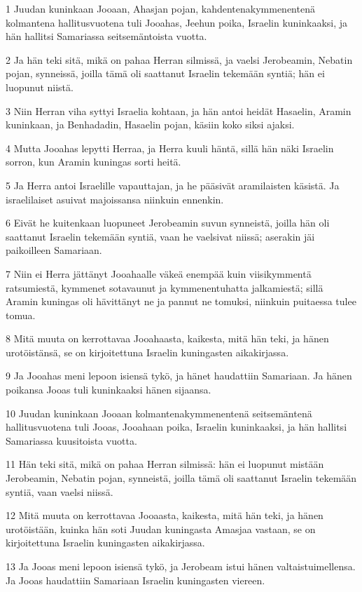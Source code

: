 \par 1 Juudan kuninkaan Jooaan, Ahasjan pojan, kahdentenakymmenentenä kolmantena hallitusvuotena tuli Jooahas, Jeehun poika, Israelin kuninkaaksi, ja hän hallitsi Samariassa seitsemäntoista vuotta.
\par 2 Ja hän teki sitä, mikä on pahaa Herran silmissä, ja vaelsi Jerobeamin, Nebatin pojan, synneissä, joilla tämä oli saattanut Israelin tekemään syntiä; hän ei luopunut niistä.
\par 3 Niin Herran viha syttyi Israelia kohtaan, ja hän antoi heidät Hasaelin, Aramin kuninkaan, ja Benhadadin, Hasaelin pojan, käsiin koko siksi ajaksi.
\par 4 Mutta Jooahas lepytti Herraa, ja Herra kuuli häntä, sillä hän näki Israelin sorron, kun Aramin kuningas sorti heitä.
\par 5 Ja Herra antoi Israelille vapauttajan, ja he pääsivät aramilaisten käsistä. Ja israelilaiset asuivat majoissansa niinkuin ennenkin.
\par 6 Eivät he kuitenkaan luopuneet Jerobeamin suvun synneistä, joilla hän oli saattanut Israelin tekemään syntiä, vaan he vaelsivat niissä; aserakin jäi paikoilleen Samariaan.
\par 7 Niin ei Herra jättänyt Jooahaalle väkeä enempää kuin viisikymmentä ratsumiestä, kymmenet sotavaunut ja kymmenentuhatta jalkamiestä; sillä Aramin kuningas oli hävittänyt ne ja pannut ne tomuksi, niinkuin puitaessa tulee tomua.
\par 8 Mitä muuta on kerrottavaa Jooahaasta, kaikesta, mitä hän teki, ja hänen urotöistänsä, se on kirjoitettuna Israelin kuningasten aikakirjassa.
\par 9 Ja Jooahas meni lepoon isiensä tykö, ja hänet haudattiin Samariaan. Ja hänen poikansa Jooas tuli kuninkaaksi hänen sijaansa.
\par 10 Juudan kuninkaan Jooaan kolmantenakymmenentenä seitsemäntenä hallitusvuotena tuli Jooas, Jooahaan poika, Israelin kuninkaaksi, ja hän hallitsi Samariassa kuusitoista vuotta.
\par 11 Hän teki sitä, mikä on pahaa Herran silmissä: hän ei luopunut mistään Jerobeamin, Nebatin pojan, synneistä, joilla tämä oli saattanut Israelin tekemään syntiä, vaan vaelsi niissä.
\par 12 Mitä muuta on kerrottavaa Jooaasta, kaikesta, mitä hän teki, ja hänen urotöistään, kuinka hän soti Juudan kuningasta Amasjaa vastaan, se on kirjoitettuna Israelin kuningasten aikakirjassa.
\par 13 Ja Jooas meni lepoon isiensä tykö, ja Jerobeam istui hänen valtaistuimellensa. Ja Jooas haudattiin Samariaan Israelin kuningasten viereen.
